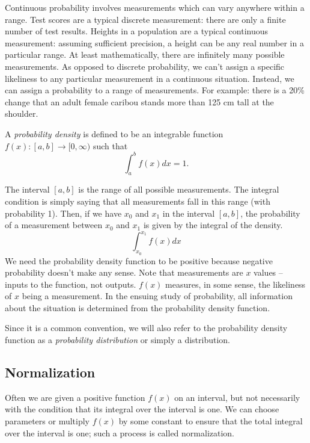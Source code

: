 \documentclass[fleqn]{report}
\begin{document}
Continuous probability involves measurements which can vary
anywhere within a range. Test scores are a typical discrete
measurement: there are only a finite number of test results.
Heights in a population are a typical continuous measurement:
assuming sufficient precision, a height can be any real number
in a particular range. At least mathematically, there are
infinitely many possible measurements. As opposed to discrete
probability, we can't assign a specific likeliness to any
particular measurement in a continuous situation. Instead, we
can assign a probability to a range of measurements. For
example: there is a 20\% change that an adult female caribou
stands more than 125 cm tall at the shoulder.

\begin{defn}
A \emph{probability density} is defined to be an integrable function
$f(x) : [a,b] \rightarrow [0, \infty)$ such that
\begin{equation*}
\int_a^b f(x) dx = 1.
\end{equation*}
\end{defn}

The interval $[a,b]$ is the range of all possible measurements.
The integral condition is simply saying that all measurements
fall in this range (with probability 1). Then, if we have
$x_0$ and $x_1$ in the interval $[a,b]$, the probability of a
measurement between $x_0$ and $x_1$ is given by the integral
of the density.
\begin{equation*}
\int_{x_0}^{x_1} f(x) dx
\end{equation*}
We need the probability density function to be positive
because negative probability doesn't make any sense. 
Note that measurements are $x$ values -- inputs to the
function, not outputs. $f(x)$ measures, in some sense, the
likeliness of $x$ being a measurement. In the ensuing study
of probability, all information about the situation
is determined from the probability density function.

Since it is a common convention, we will also refer to the
probability density function as a \emph{probability
distribution} or simply a distribution.

\subsection{Normalization}
\label{normalization}

Often we are given a positive function $f(x)$ on an interval,
but not necessarily with the condition that its integral over
the interval is one. We can choose parameters or
multiply $f(x)$ by some constant to ensure that the total
integral over the interval is one; such a process is called
normalization. 
\end{document}
